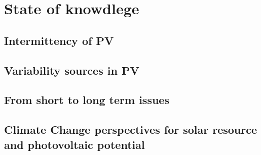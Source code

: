 \chapter{State of knowdlege\label{cha:state}}
\section{Intermittency of PV}
\section{Variability sources in PV}
\section{From short to long term issues}
\section{Climate Change perspectives for solar resource and photovoltaic potential}

%